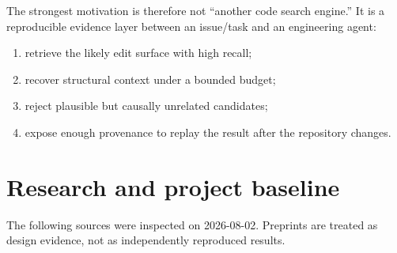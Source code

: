 \documentclass[UTF8,12pt,openany]{ctexbook}
\begin{document}
The strongest motivation is therefore not “another code search engine.” It is a reproducible evidence layer between an issue/task and an engineering agent:\par

\begin{enumerate}
\item retrieve the likely edit surface with high recall;
\item recover structural context under a bounded budget;
\item reject plausible but causally unrelated candidates;
\item expose enough provenance to replay the result after the repository changes.
\end{enumerate}

\section{Research and project baseline}

The following sources were inspected on 2026-08-02. Preprints are treated as design evidence, not as independently reproduced results.\par
\end{document}

